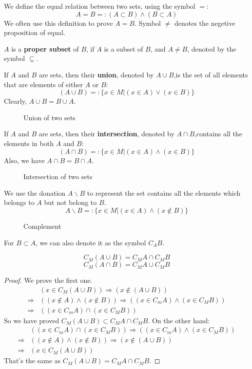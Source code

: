 We define the equal relation between two sets, using the symbol $=$:
\[A=B =:(A\subset B)\wedge(B\subset A)\]
We often use this definition to prove $A=B$.
Symbol $\neq$ denotes the negetive proposition of equal.

$A$ is a \textbf{proper subset} of $B$, if $A$ is a subset of $B$, and $A\neq B$, denoted by the symbol $\subseteq $.

If $A$ and $B$ are sets, then their \textbf{union}, denoted by $A \cup  B$,is the set of all elements that are elements of either $A$ or $B$:
\[(A\cup B)=:\{x\in M|(x\in A)\vee (x\in B)\}\]
Clearly, $A\cup B=B\cup A$.
\begin{figure}
    \centering
    \caption{Union of two sets}
    
\end{figure}

If $A$ and $B$ are sets, then their \textbf{intersection}, denoted by $A \cap  B$,contains all the elements in both $A$ and $B$:
\[(A\cap B)=:\{x\in M|(x\in A)\wedge (x\in B)\}\]
Also, we have $A\cap B=B\cap A$.
\begin{figure}[h] 
    \centering
    \caption{Intersection of two sets}
    
\end{figure}

We use the donation $A\backslash B$ to represent the set contains all the elements which belongs to $A$ but not belong to $B$.
\[A\backslash B=:\{x\in M|(x\in A)\wedge(x\not\in B)\}\]
\begin{figure}[ht]
    \centering
    \caption{Complement}
    
\end{figure}

For $B\subset A$, we can also denote it as the symbol $C_{A}B$.

\begin{question}[de Morgen]
    \[C_{M}(A\cup B)=C_{M}A\cap C_{M}B\]
    \[C_{M}(A\cap B)=C_{M}A\cup C_{M}B\]
\end{question}
\begin{proof}We prove the first one.
    \[
    \begin{aligned}
        &(x\in C_{M}(A\cup B))\Rightarrow (x \not\in (A\cup B))\\ \Rightarrow& ((x\not\in A)\wedge(x\not\in B))
        \Rightarrow((x\in C_{m}A)\wedge(x\in C_{M}B))\\ \Rightarrow&((x\in C_{m}A)\cap(x\in C_{M}B))
    \end{aligned}\]
    So we have proved $C_{M}(A\cup B)\subset C_{M}A\cap C_{M}B$. On the other hand:
    \[\begin{aligned}
        &((x\in C_{m}A)\cap(x\in C_{M}B))\Rightarrow ((x\in C_{m}A)\wedge(x\in C_{M}B))\\ \Rightarrow& ((x\not\in A)\wedge(x\not\in B))\Rightarrow (x \not\in (A\cup B))\\ \Rightarrow&(x\in C_{M}(A\cup B))
    \end{aligned}\]
    That's the same as $C_{M}(A\cup B)=C_{M}A\cap C_{M}B$.
\end{proof}

